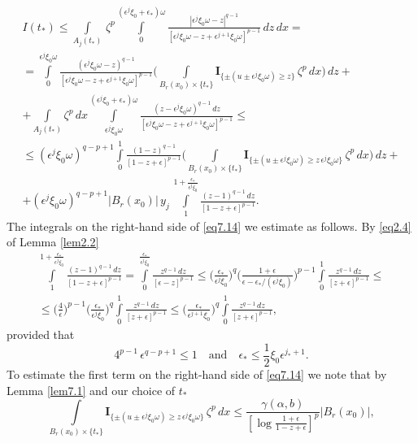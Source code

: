 \documentclass[a4paper,11pt,fullpage]{article}
\numberwithin{equation}{section}
\begin{document}
\begin{multline}\label{eq7.14}
I(t_*)\leqslant \int\limits_{A_j(t_*)}\,\zeta^p\int\limits^{(\epsilon^j\xi_0+\epsilon_*)\omega}_0
\frac{|\epsilon^j\xi_0\omega-z|^{q-1}}{[\epsilon^j\xi_0\omega-z+\epsilon^{j+1}\xi_0\omega]^{p-1}}\,dz\,dx=\\
= \int\limits^{\epsilon^j\xi_0\omega}_0
\frac{(\epsilon^j\xi_0\omega-z)^{q-1}}{[\epsilon^j\xi_0\omega-z+\epsilon^{j+1}\xi_0\omega]^{p-1}}
\bigg(\int\limits_{B_r(x_0)\times\{t_*\}}\mathbf{I}_{\{\pm(u\pm\epsilon^j\xi_0\omega)\geqslant z\}}\,\zeta^p\,dx\bigg)\,dz+\\+
\int\limits_{A_j(t_*)}\zeta^p\,dx\int\limits^{(\epsilon^j\xi_0+\epsilon_*)\omega}_{\epsilon^j\xi_0\omega}
\frac{(z-\epsilon^j\xi_0\omega)^{q-1}\,dz}{[\epsilon^j\xi_0\omega-z+\epsilon^{j+1}\xi_0\omega]^{p-1}}\leqslant\\\leqslant
(\epsilon^j\xi_0 \omega)^{q-p+1}\int\limits^1_0\frac{(1-z)^{q-1}}
{[1-z+\epsilon]^{p-1}}\bigg(\int\limits_{B_r(x_0)\times\{t_*\}}\mathbf{I}_{\{\pm(u\pm\epsilon^j\xi_0\omega)\geqslant z\,\epsilon^j\xi_0\omega \}}\,\zeta^p
\,dx\bigg)\,dz+\\+
(\epsilon^j\xi_0 \omega)^{q-p+1}|B_r(x_0)|\,y_j\,\int\limits^{1+\frac{\epsilon_*}{\epsilon^j\xi_0}}_1
\frac{(z-1)^{q-1}\,dz}{[1-z+\epsilon]^{p-1}}.
\end{multline}
The integrals on the right-hand side of \eqref{eq7.14} we estimate as follows. By \eqref{eq2.4} of Lemma \ref{lem2.2}
\begin{multline*}
\int\limits^{1+\frac{\epsilon_*}{\epsilon^j\xi_0}}_1
\frac{(z-1)^{q-1}\,dz}{[1-z+\epsilon]^{p-1}}=\int\limits^{\frac{\epsilon_*}{\epsilon^j\xi_0}}_0\frac{z^{q-1}\,dz}{[\epsilon-z]^{p-1}}\leqslant
\Big(\frac{\epsilon_*}{\epsilon^j\xi_0}\Big)^q\Big(\frac{1+\epsilon}{\epsilon-\epsilon_*/(\epsilon^j\xi_0)}\Big)^{p-1}
\int\limits^{1}_0\frac{z^{q-1}\,dz}{[z+\epsilon]^{p-1}}\leqslant\\\leqslant \Big(\frac{4}{\epsilon}\Big)^{p-1}\Big(\frac{\epsilon_*}{\epsilon^j\xi_0}\Big)^q
\int\limits^{1}_0\frac{z^{q-1}\,dz}{[z+\epsilon]^{p-1}}\leqslant \Big(\frac{\epsilon_*}{\epsilon^{j+1}\xi_0}\Big)^q
\int\limits^{1}_0\frac{z^{q-1}\,dz}{[z+\epsilon]^{p-1}},
\end{multline*}
provided that 
$$4^{p-1}\,\epsilon^{q-p+1}\leqslant 1 \quad \text{and}\quad \epsilon_*\leqslant \frac{1}{2}\xi_0\epsilon^{j_*+1}.$$
To estimate the first term on the right-hand side of \eqref{eq7.14} we note that
by Lemma \ref{lem7.1} and our choice of $t_*$
\begin{equation*}
\int\limits_{B_r(x_0)\times\{t_*\}}\mathbf{I}_{\{\pm(u\pm\epsilon^j\xi_0\omega)\geqslant z\,\epsilon^j\xi_0\omega \}}\,\zeta^p\,dx\leqslant\frac{\gamma(\alpha, b)}{[\log\frac{1+\epsilon}{1-z+\epsilon}]^p}|B_r(x_0)|,
\end{equation*}
\end{document}

